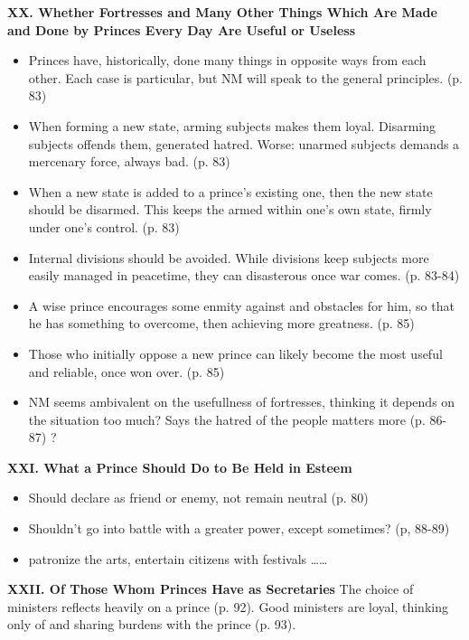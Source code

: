 \documentclass[10pt]{article}
\begin{document}
\textbf{XX. Whether Fortresses and Many Other Things Which Are Made and 
Done by Princes Every Day Are Useful or Useless}
\begin{itemize}
\item
    Princes have, historically, done many things in opposite ways
    from each other. Each case is particular, but NM will speak to
    the general principles. (p. 83)
\item 
    When forming a new state, arming subjects makes them loyal. 
    Disarming subjects offends them,
    generated hatred. Worse: unarmed subjects demands a mercenary 
    force, always bad. (p. 83)
\item
    When a new state is added to a prince's existing one, then the new
    state should be disarmed. This keeps the armed within one's own
    state, firmly under one's control. (p. 83) 
\item
    Internal divisions should be avoided. While divisions keep subjects
    more easily managed in peacetime, they can disasterous once war 
    comes. (p. 83-84)
\item
    A wise prince encourages some enmity against and obstacles for him,
    so that he has something to overcome, then achieving more greatness.
    (p. 85)
\item
    Those who initially oppose a new prince can likely become the most
    useful and reliable, once won over. (p. 85)
\item
    NM seems ambivalent on the usefullness of fortresses, thinking it
    depends on the situation too much? Says the hatred of the people
    matters more (p. 86-87) ?
\end{itemize}

\textbf{XXI. What a Prince Should Do to Be Held in Esteem}
\begin{itemize}
    \item 
        Should declare as friend or enemy, not remain neutral (p. 80)
    \item 
        Shouldn't go into battle with a greater power, except
        sometimes? (p, 88-89)
    \item 
        patronize the arts, entertain citizens with festivals \ldots \ldots
\end{itemize}

\textbf{XXII. Of Those Whom Princes Have as Secretaries}
The choice of ministers reflects heavily on a prince (p. 92).
Good ministers are loyal, thinking only of and sharing burdens
with the prince (p. 93).
\end{document}
